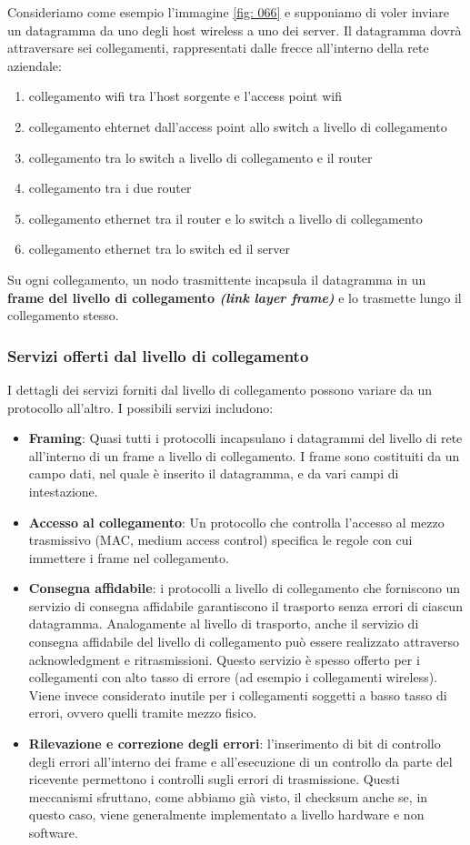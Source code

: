 \documentclass[11pt,a4paper]{article}
\begin{document}
Consideriamo come esempio l'immagine \ref{fig: 066} e supponiamo di voler inviare un datagramma da uno degli host wireless a uno dei server. Il datagramma dovrà attraversare sei collegamenti, rappresentati dalle frecce all'interno della rete aziendale:
\begin{enumerate}
	\item collegamento wifi tra l'host sorgente e l'access point wifi
	\item collegamento ehternet dall'access point allo switch a livello di collegamento
	\item collegamento tra lo switch a livello di collegamento e il router
	\item collegamento tra i due router
	\item collegamento ethernet tra il router e lo switch a livello di collegamento
	\item collegamento ethernet tra lo switch ed il server
\end{enumerate}
Su ogni collegamento, un nodo trasmittente incapsula il datagramma in un \textbf{frame del livello di collegamento \textit{(link layer frame)}} e lo trasmette lungo il collegamento stesso.
\subsubsection{Servizi offerti dal livello di collegamento}
I dettagli dei servizi forniti dal livello di collegamento possono variare da un protocollo all'altro. I possibili servizi includono:
\begin{itemize}
	\item \textbf{Framing}: Quasi tutti i protocolli incapsulano i datagrammi del livello di rete all'interno di un frame a livello di collegamento. I frame sono costituiti da un campo dati, nel quale è inserito il datagramma, e da vari campi di intestazione.
	\item \textbf{Accesso al collegamento}: Un protocollo che controlla l'accesso al mezzo trasmissivo (MAC, medium access control) specifica le regole con cui immettere i frame nel collegamento.
	\item \textbf{Consegna affidabile}: i protocolli a livello di collegamento che forniscono un servizio di consegna affidabile garantiscono il trasporto senza errori di ciascun datagramma. Analogamente al livello di trasporto, anche il servizio di consegna affidabile del livello di collegamento può essere realizzato attraverso acknowledgment e ritrasmissioni. Questo servizio è spesso offerto per i collegamenti con alto tasso di errore (ad esempio i collegamenti wireless). Viene invece considerato inutile per i collegamenti soggetti a basso tasso di errori, ovvero quelli tramite mezzo fisico.
	\item \textbf{Rilevazione e correzione degli errori}: l'inserimento di bit di controllo degli errori all'interno dei frame e all'esecuzione di un controllo da parte del ricevente permettono i controlli sugli errori di trasmissione. Questi meccanismi sfruttano, come abbiamo già visto, il checksum anche se, in questo caso, viene generalmente implementato a livello hardware e non software.
\end{itemize}
\end{document}
